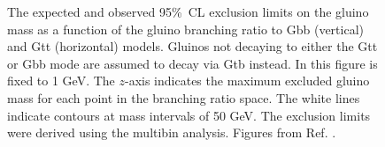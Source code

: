 \begin{figure}[htbp]
  \centering 
  \caption{The expected  and observed  95\%~CL exclusion limits on the gluino mass as a function of the gluino branching ratio to Gbb (vertical) and Gtt (horizontal) models. Gluinos not decaying to either the Gtt or Gbb mode are assumed to decay via Gtb instead. In this figure \mchi is fixed to 1 GeV. The $z$-axis indicates the maximum excluded gluino mass for each point in the branching ratio space. The white lines indicate contours at mass intervals of 50 GeV. The exclusion limits were derived using the multibin analysis.
  Figures from Ref. \cite{ATLAS-CONF-2018-041}.}
  \label{fig:limits_triangle_1}
\end{figure}

